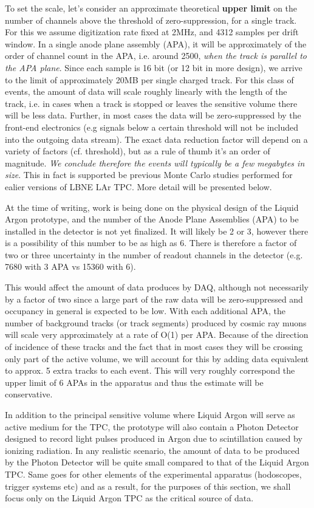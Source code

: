 To set the scale, let's consider an approximate theoretical \textbf{upper limit} on the number of channels above the threshold
of zero-suppression, for a single track. For this we assume digitization rate fixed at 2MHz, and 4312 samples per drift window. In a single
anode plane assembly (APA), it will be approximately of the order of channel count in the APA, i.e. around 2500, \textit{when the track is parallel to the APA plane}.
Since each sample is 16 bit (or 12 bit in more design), we arrive to the limit of approximately 20MB per single charged track.
For this class of events, the amount of data will scale roughly linearly with the length of the track, i.e. in cases when a track is stopped or leaves the sensitive volume
there will be less data. Further, in most cases the data will be zero-suppressed by the front-end electronics (e.g signals below a certain threshold
will not be included into the outgoing data stream). The exact data reduction factor will depend on a variety of factors (cf. threshold), but as a rule of
thumb it's an order of magnitude. \textit{We conclude therefore the events will typically be a few megabytes in size}. This in fact is supported
be previous Monte Carlo studies performed for ealier versions of LBNE LAr TPC. More detail will be presented below.

At the time of writing, work is being done on the physical design of the Liquid Argon prototype, and the number of the Anode Plane Assemblies (APA)
to be installed in the detector is not yet finalized. It will likely be 2 or 3, however there is a possibility of this number to be as high as 6.  There is therefore a
factor of two or three  uncertainty in the number of readout channels in the detector (e.g. 7680 with 3 APA vs 15360 with 6).

This would affect the amount of data produces by DAQ, although not necessarily by a factor of two since a large part of the raw data will be zero-suppressed
and occupancy in general is expected to be low. With each additional APA, the number of background tracks (or track segments) produced by cosmic ray
muons will scale very approximately at a rate of O(1) per APA. Because of the direction of incidence of these tracks and the fact that in most cases they will
be crossing only part of the active volume, we will account for this by adding data equivalent to approx. 5 extra tracks to each event. This will very roughly correspond
the upper limit of 6 APAs in the apparatus and thus the estimate will be conservative.

In addition to the principal sensitive volume where Liquid Argon will serve as active medium for the TPC, the prototype will also contain a Photon Detector designed
to record light pulses produced in Argon due to scintillation caused by ionizing radiation. In any realistic scenario, the amount of data to be produced by
the Photon Detector will be quite small compared to that of the Liquid Argon TPC. Same goes for other elements of the experimental apparatus (hodoscopes,
trigger systems etc) and as a result, for the purposes of this section, we shall focus only on the Liquid Argon TPC as the critical source of data.



